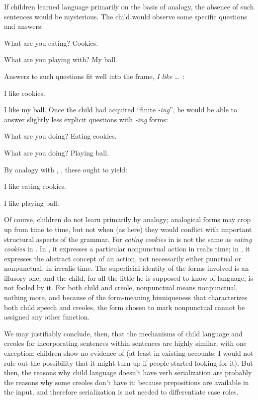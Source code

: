 If children learned language primarily on the basis of analogy, the absence of such sentences would be mysterious. The child would observe some specific questions and answers:

\ea\label{ex:3:43}
What are you eating? Cookies.
\z

\ea\label{ex:3:44}
 What are you playing with? My ball.
\z

\noindent Answers to such questions fit well into the frame, \textit{I like} \ldots~:

\ea\label{ex:3:45}
 I like cookies.
\z

\ea\label{ex:3:46}
I like my ball.
\z
Once the child had acquired ``finite \textit{-ing}'', he would be able to answer slightly less explicit questions with \textit{-ing} forms:

\ea\label{ex:3:47}
 What are you doing? Eating cookies.
\z

\ea\label{ex:3:48}
 What are you doing? Playing ball.
\z

\noindent By analogy with , , these ought to yield:

\ea\label{ex:3:49}
 I like eating cookies. 
\z

\ea\label{ex:3:50}
 I like playing ball. 
\z

Of course, children do not learn primarily by analogy; analogical
forms may crop up from time to time, but not when (as here) they would conflict with important structural aspects of the grammar. For \textit{eating cookies} in  is not the same as \textit{eating cookies} in . In , it expresses a particular nonpunctual action in realis time; in , it expresses the abstract concept of an action, not necessarily either punctual or nonpunctual, in irrealis time. The superficial identity of the forms involved is an illusory one, and the child, for all the little he is supposed to know of language, is not fooled by it. For both child and creole, nonpunctual means nonpunctual, nothing more, and because of the form-meaning biuniqueness that characterizes both child speech and creoles, the form chosen to mark nonpunctual cannot be assigned any other function.

We may justifiably conclude, then, that the mechanisms of child language and creoles for incorporating sentences within sentences are highly similar, with one exception: children show no evidence of  (at least in existing accounts; I would not rule out the possibility that it might turn up if people started looking for it). But then, the reasons why child language doesn't have verb serialization are probably the reasons why some creoles don't have it: because prepositions are available in the input, and therefore serialization is not needed to differentiate case roles.

